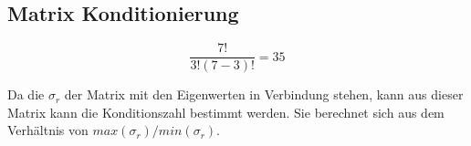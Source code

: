 \documentclass[a4paper,12pt,fleqn]{article}
\begin{document}
\subsection{Matrix Konditionierung}
% 
\begin{equation}
\frac{7!}{3!(7-3)!}=35
\end{equation}
%
\begin{equation}
\end{equation}
%

%
Da die $\sigma_r$ der Matrix mit den Eigenwerten in Verbindung stehen, kann aus dieser Matrix kann die Konditionszahl bestimmt werden. Sie berechnet sich aus dem Verhältnis von $ max(\sigma_r) / min(\sigma_r) $. 
%
\end{document}
